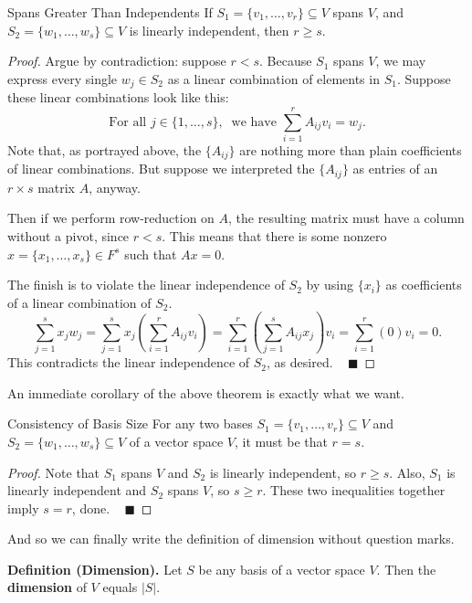 \begin{theorem}{Spans Greater Than Independents}
    If $S_1 = \{v_1, \dots, v_r\} \subseteq V$ spans $V$, and $S_2 = \{w_1, \dots, w_s\} \subseteq V$ is linearly independent, then $r \geq s$. 
\end{theorem}

\begin{proof}
    Argue by contradiction: suppose $r < s$.  Because $S_1$ spans $V$, we may express every single $w_j \in S_2$ as a linear combination of elements in $S_1$.  Suppose these linear combinations look like this:
    \[ \text{For all } j \in \{1, \dots, s\}, ~ \text{ we have } \sum_{i = 1}^r A_{ij} v_i = w_j. \]
    Note that, as portrayed above, the $\{A_{ij}\}$ are nothing more than plain coefficients of linear combinations.  But suppose we interpreted the $\{A_{ij}\}$ as entries of an $r \times s$ matrix $A$, anyway.
    
    Then if we perform row-reduction on $A$, the resulting matrix must have a column without a pivot, since $r < s$.  This means that there is some nonzero $x = \{x_1, \dots, x_s\}\in F^s$ such that $Ax = 0$.

    The finish is to violate the linear independence of $S_2$ by using $\{x_i\}$ as coefficients of a linear combination of $S_2$.
    \[ \sum_{j = 1}^s x_j w_j = \sum_{j = 1}^s x_j \left(\sum_{i = 1}^r A_{ij}v_i\right) = \sum_{i = 1}^r \left(\sum_{j = 1}^s A_{ij} x_j \right) v_i = \sum_{i = 1}^r (0)v_i = 0.  \]
    This contradicts the linear independence of $S_2$, as desired. ~ $\blacksquare$
\end{proof}

An immediate corollary of the above theorem is exactly what we want.

\begin{theorem}{Consistency of Basis Size}
    For any two bases $S_1 = \{v_1, \dots, v_r \} \subseteq V$ and $S_2 = \{w_1, \dots, w_s \} \subseteq V$ of a vector space $V$, it must be that $r = s$.
\end{theorem}

\begin{proof}
    Note that $S_1$ spans $V$ and $S_2$ is linearly independent, so $r \geq s$.  Also, $S_1$ is linearly independent and $S_2$ spans $V$, so $s \geq r$.  These two inequalities together imply $s = r$, done. ~ $\blacksquare$
\end{proof}

And so we can finally write the definition of dimension without question marks.

\textbf{Definition (Dimension).} Let $S$ be any basis of a vector space $V$.  Then the \textbf{dimension} of $V$ equals $|S|$.

